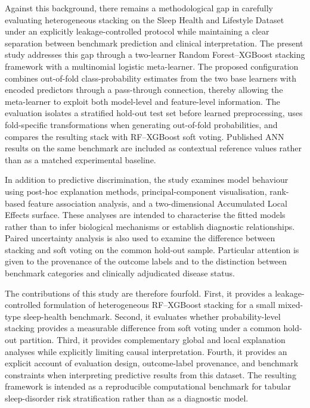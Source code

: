 \documentclass[a4paper,fleqn]{cas-dc}
\begin{document}
Against this background, there remains a methodological gap in carefully evaluating heterogeneous stacking on the Sleep Health and Lifestyle Dataset under an explicitly leakage-controlled protocol while maintaining a clear separation between benchmark prediction and clinical interpretation. The present study addresses this gap through a two-learner Random Forest--XGBoost stacking framework with a multinomial logistic meta-learner. The proposed configuration combines out-of-fold class-probability estimates from the two base learners with encoded predictors through a pass-through connection, thereby allowing the meta-learner to exploit both model-level and feature-level information. The evaluation isolates a stratified hold-out test set before learned preprocessing, uses fold-specific transformations when generating out-of-fold probabilities, and compares the resulting stack with RF--XGBoost soft voting. Published ANN results on the same benchmark are included as contextual reference values rather than as a matched experimental baseline.

In addition to predictive discrimination, the study examines model behaviour using post-hoc explanation methods, principal-component visualisation, rank-based feature association analysis, and a two-dimensional Accumulated Local Effects surface. These analyses are intended to characterise the fitted models rather than to infer biological mechanisms or establish diagnostic relationships. Paired uncertainty analysis is also used to examine the difference between stacking and soft voting on the common hold-out sample. Particular attention is given to the provenance of the outcome labels and to the distinction between benchmark categories and clinically adjudicated disease status.

The contributions of this study are therefore fourfold. First, it provides a leakage-controlled formulation of heterogeneous RF--XGBoost stacking for a small mixed-type sleep-health benchmark. Second, it evaluates whether probability-level stacking provides a measurable difference from soft voting under a common hold-out partition. Third, it provides complementary global and local explanation analyses while explicitly limiting causal interpretation. Fourth, it provides an explicit account of evaluation design, outcome-label provenance, and benchmark constraints when interpreting predictive results from this dataset. The resulting framework is intended as a reproducible computational benchmark for tabular sleep-disorder risk stratification rather than as a diagnostic model.
\end{document}
